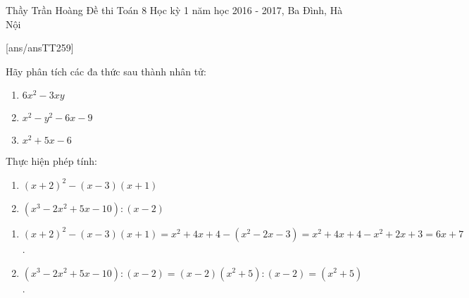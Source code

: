 \begin{name}
{Thầy Trần Hoàng}
{Đề thi Toán 8 Học kỳ 1 năm học 2016 - 2017, Ba Đình, Hà Nội }
\end{name}
\setcounter{ex}{0}
[ans/ansTT259]
\begin{ex}%
	Hãy phân tích các đa thức sau thành nhân tử:
	\begin{enumerate}
		\item $6x^{2}-3xy$
		\item $x^{2}-y^{2}-6x-9$	
		\item $x^{2}+5x-6$
	\end{enumerate}
\end{ex}
\begin{ex}%
Thực hiện phép tính:
\begin{enumerate}
	\item $(x+2)^2-(x-3)(x+1)$
	\item $(x^3-2x^2+5x-10) : (x-2)$
\end{enumerate}
	\loigiai
	{
	\begin{enumerate}
		\item 
		$(x+2)^{2}-(x-3)(x+1)=x^{2}+4x+4-(x^{2}-2x-3)=x^{2}+4x+4-x^2+2x+3=6x+7$.
		\item $(x^{3}-2x^{2}+5x-10) : (x-2)=(x-2)(x^{2}+5) : (x-2)=(x^{2}+5)$.
	\end{enumerate}
	}
\end{ex}
